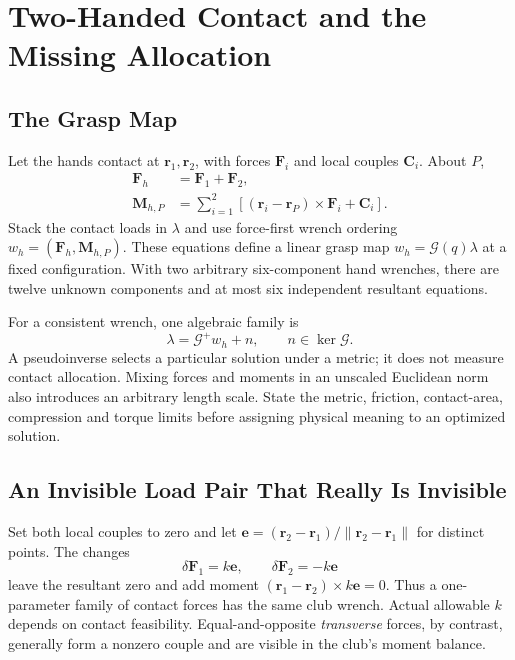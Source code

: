 \documentclass[11pt,a4paper]{article}
\newcommand{\vect}[1]{\boldsymbol{#1}}
\begin{document}
\section{Two-Handed Contact and the Missing Allocation}
\subsection{The Grasp Map}
Let the hands contact at $\vect r_1,\vect r_2$, with forces $\vect F_i$ and local couples $\vect C_i$. About $P$,
\begin{align}
\vect F_h&=\vect F_1+\vect F_2,\\
\vect M_{h,P}&=\sum_{i=1}^2\left[(\vect r_i-\vect r_P)\times\vect F_i+\vect C_i\right].
\end{align}
Stack the contact loads in $\lambda$ and use force-first wrench ordering
$w_h=(\vect F_h,\vect M_{h,P})$. These equations define a linear grasp map
$w_h=\mathcal G(q)\lambda$ at a fixed configuration. With two arbitrary six-component hand wrenches, there are twelve unknown components and at most six independent resultant equations.

For a consistent wrench, one algebraic family is
\begin{equation}
\lambda=\mathcal G^+w_h+n,\qquad n\in\ker\mathcal G.
\end{equation}
A pseudoinverse selects a particular solution under a metric; it does not measure contact allocation. Mixing forces and moments in an unscaled Euclidean norm also introduces an arbitrary length scale. State the metric, friction, contact-area, compression and torque limits before assigning physical meaning to an optimized solution.

\subsection{An Invisible Load Pair That Really Is Invisible}
Set both local couples to zero and let
$\vect e=(\vect r_2-\vect r_1)/\|\vect r_2-\vect r_1\|$ for distinct points.
The changes
\begin{equation}
\delta\vect F_1=k\vect e,\qquad\delta\vect F_2=-k\vect e
\end{equation}
leave the resultant zero and add moment
$(\vect r_1-\vect r_2)\times k\vect e=0$.
Thus a one-parameter family of contact forces has the same club wrench. Actual allowable $k$ depends on contact feasibility. Equal-and-opposite \emph{transverse} forces, by contrast, generally form a nonzero couple and are visible in the club's moment balance.
\end{document}
